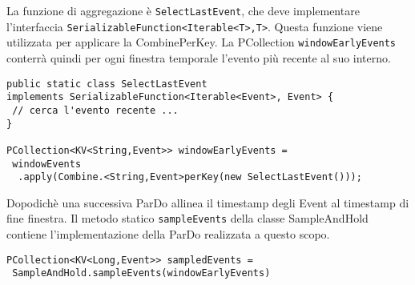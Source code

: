La funzione di aggregazione è \texttt{SelectLastEvent}, che deve implementare l'interfaccia \texttt{SerializableFunction<Iterable<T>,T>}. Questa funzione viene utilizzata per applicare la CombinePerKey. La PCollection \texttt{windowEarlyEvents} conterrà quindi per ogni finestra temporale l'evento più recente al suo interno.
\begin{lstlisting}
public static class SelectLastEvent 
implements SerializableFunction<Iterable<Event>, Event> {
 // cerca l'evento recente ...
}

PCollection<KV<String,Event>> windowEarlyEvents = 
 windowEvents
  .apply(Combine.<String,Event>perKey(new SelectLastEvent()));
\end{lstlisting}
Dopodichè una successiva ParDo allinea il timestamp degli Event al timestamp di fine finestra. Il metodo statico \texttt{sampleEvents} della classe SampleAndHold contiene l'implementazione della ParDo realizzata a questo scopo.
\begin{lstlisting}
PCollection<KV<Long,Event>> sampledEvents =
 SampleAndHold.sampleEvents(windowEarlyEvents)
\end{lstlisting}
